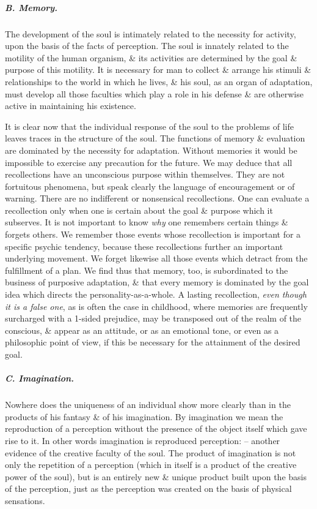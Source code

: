 \documentclass{article}
\begin{document}
\subparagraph{B. Memory.} The development of the soul is intimately related to the necessity for activity, upon the basis of the facts of perception. The soul is innately related to the motility of the human organism, \& its activities are determined by the goal \& purpose of this motility. It is necessary for man to collect \& arrange his stimuli \& relationships to the world in which he lives, \& his soul, as an organ of adaptation, must develop all those faculties which play a role in his defense \& are otherwise active in maintaining his existence.

It is clear now that the individual response of the soul to the problems of life leaves traces in the structure of the soul. The functions of memory \& evaluation are dominated by the necessity for adaptation. Without memories it would be impossible to exercise any precaution for the future. We may deduce that all recollections have an unconscious purpose within themselves. They are not fortuitous phenomena, but speak clearly the language of encouragement or of warning. There are no indifferent or nonsensical recollections. One can evaluate a recollection only when one is certain about the goal \& purpose which it subserves. It is not important to know {\it why} one remembers certain things \& forgets others. We remember those events whose recollection is important for a specific psychic tendency, because these recollections further an important underlying movement. We forget likewise all those events which detract from the fulfillment of a plan. We find thus that memory, too, is subordinated to the business of purposive adaptation, \& that every memory is dominated by the goal idea which directs the personality-as-a-whole. A lasting recollection, {\it even though it is a false one}, as is often the case in childhood, where memories are frequently surcharged with a 1-sided prejudice, may be transposed out of the realm of the conscious, \& appear as an attitude, or as an emotional tone, or even as a philosophic point of view, if this be necessary for the attainment of the desired goal.

\subparagraph{C. Imagination.} Nowhere does the uniqueness of an individual show more clearly than in the products of his fantasy \& of his imagination. By imagination we mean the reproduction of a perception without the presence of the object itself which gave rise to it. In other words imagination is reproduced perception: -- another evidence of the creative faculty of the soul. The product of imagination is not only the repetition of a perception (which in itself is a product of the creative power of the soul), but is an entirely new \& unique product built upon the basis of the perception, just as the perception was created on the basis of physical sensations.
\end{document}
